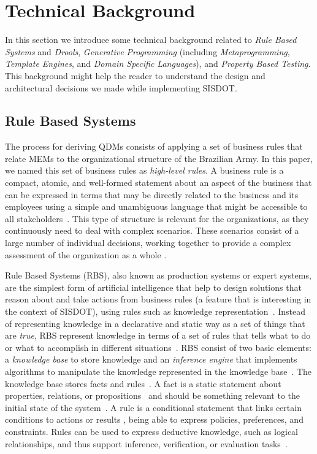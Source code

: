 \documentclass[AMA,STIX1COL]{WileyNJD-v2}
\newcommand{\callers}{\emph{high-level rules}\xspace}
\begin{document}
\section{Technical Background}
\label{back}


In this section we
introduce some technical background related to \emph{Rule Based Systems} and
\emph{Drools}, \emph{Generative Programming} (including \emph{Metaprogramming},
\emph{Template Engines}, and \emph{Domain Specific Languages}), and
\emph{Property Based Testing}. This background might help the reader to
understand the design and architectural decisions we made
while implementing SISDOT.  

\subsection{Rule Based Systems}
\label{sec:rbs}
The process for deriving QDMs consists of applying a set of business rules that relate MEMs to the organizational structure of the Brazilian Army. In this paper, we named this set of business rules as \callers. A business rule is a compact, atomic, and well-formed statement about an aspect of the business that can be expressed in terms that may be directly related to the business and its employees using a simple and unambiguous language that might be accessible to all stakeholders~\cite{graham2007business}. This type of structure is relevant for the organizations, as they continuously need to deal with complex scenarios. These scenarios consist of a large number of individual decisions, working together to provide a complex assessment of the organization as a whole \cite{salatino2016mastering}.

Rule Based Systems (RBS), also known as production systems or expert systems, are the simplest form of artificial intelligence that help to design solutions that reason about and take actions from business rules (a feature that is interesting in the context of SISDOT), using rules such as knowledge representation~\cite{grosan2011}. Instead of representing knowledge in a declarative and static way as a set of things that are \emph{true}, RBS represent knowledge in terms of a set of rules that tells what to do or what to accomplish in different situations~\cite{grosan2011}. RBS consist of two basic elements: a \emph{knowledge base} to store knowledge and an \emph{inference engine} that implements  algorithms to manipulate the knowledge represented in the knowledge base~\cite{grosan2011,DBLP:books/daglib/0070547,gallacher1989}. The knowledge base stores facts and rules~\cite{DBLP:journals/cacm/Hayes-Roth85}. A fact is a static statement about properties, relations, or propositions~\cite{DBLP:journals/cacm/Hayes-Roth85} and should be something relevant to the initial state of the system~\cite{grosan2011}. A rule is a conditional statement that links certain conditions to actions or results \cite{abraham2005}, being able to express policies, preferences, and constraints. Rules can be used to express deductive knowledge, such as logical relationships, and thus support inference, verification, or evaluation tasks~\cite{DBLP:journals/cacm/Hayes-Roth85}.
\end{document}

